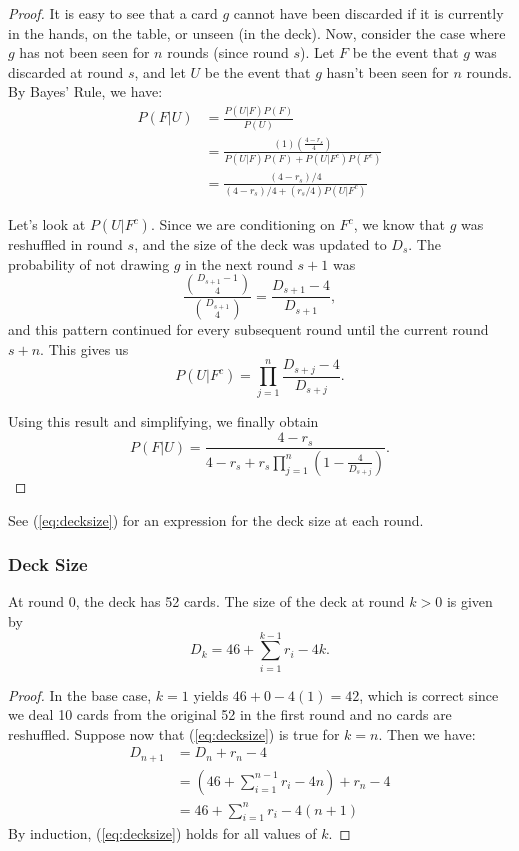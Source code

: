 \documentclass[11pt]{article}
\begin{document}
\begin{proof}
  It is easy to see that a card $g$ cannot have been discarded if it is currently in the hands, on the table, or unseen (in the deck). Now, consider the case where $g$ has not been seen for $n$ rounds (since round $s$). Let $F$ be the event that $g$ was discarded at round $s$, and let $U$ be the event that $g$ hasn't been seen for $n$ rounds. By Bayes' Rule, we have:
\begin{align}
  P(F|U) &= \frac{P(U|F)P(F)}{P(U)} \\
  &= \frac{(1)\left(\frac{4-r_s}{4}\right)}{P(U|F)P(F) + P(U|F^c)P(F^c)} \\
  &= \frac{(4-r_s)/4}{(4-r_s)/4 + (r_s/4)P(U|F^c)}
\end{align}

Let's look at $P(U|F^c)$. Since we are conditioning on $F^c$, we know that $g$ was reshuffled in round $s$, and the size of the deck was updated to $D_s$. The probability of not drawing $g$ in the next round $s+1$ was
\begin{equation}
  \frac{{D_{s+1}-1 \choose 4}}{{D_{s+1} \choose 4}} = \frac{D_{s+1}-4}{D_{s+1}},
\end{equation} and this pattern continued for every subsequent round until the current round $s+n$. This gives us
\begin{equation}
  P(U|F^c) = \prod_{j=1}^n \frac{D_{s+j} - 4}{D_{s+j}}.
\end{equation}

Using this result and simplifying, we finally obtain
\begin{equation}
  P(F|U) = \frac{4-r_s}{4-r_s+r_s\prod_{j=1}^n(1-\frac{4}{{D_{s+j}}})}.
\end{equation}
\end{proof}

See (\ref{eq:decksize}) for an expression for the deck size at each round.

\subsubsection{Deck Size}

At round $0$, the deck has 52 cards. The size of the deck at round $k > 0$ is given by
\begin{equation}
  D_k = 46 + \sum_{i=1}^{k-1} r_i - 4k.
\label{eq:decksize} \end{equation}

\begin{proof}
  In the base case, $k=1$ yields $46+0-4(1) = 42$, which is correct since we deal 10 cards from the original 52 in the first round and no cards are reshuffled. Suppose now that (\ref{eq:decksize}) is true for $k=n$. Then we have:
    \begin{align}
      D_{n+1} &= D_n + r_n - 4 \\
      &= (46 + \sum_{i=1}^{n-1} r_i - 4n) + r_n - 4 \\
      &= 46 + \sum_{i=1}^n r_i - 4(n+1)
    \end{align}
  By induction, (\ref{eq:decksize}) holds for all values of $k$.
\end{proof}
\end{document}
